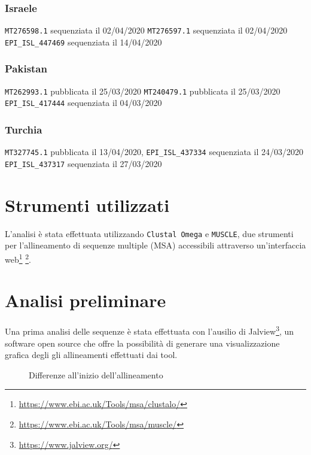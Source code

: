 \documentclass[11pt,italian]{article}
\makeatletter
\newcommand*{\lstitem}[1][]{%
  \setbox0\hbox\bgroup
    \patchcmd{\lst@InlineM}{\@empty}{\@empty\egroup\item[\usebox0]\leavevmode\ignorespaces}{}{}%
    \lstinline[#1]%
}
\makeatother
\begin{document}
\subsubsection*{Israele}
\begin{description}
    \lstitem{MT276598.1} sequenziata il 02/04/2020
    \lstitem{MT276597.1} sequenziata il 02/04/2020
    \lstitem{EPI_ISL_447469} sequenziata il 14/04/2020
\end{description}

\subsubsection*{Pakistan}
\begin{description}
    \lstitem{MT262993.1} pubblicata il 25/03/2020
    \lstitem{MT240479.1} pubblicata il 25/03/2020
    \lstitem{EPI_ISL_417444} sequenziata il 04/03/2020
\end{description}

\subsubsection*{Turchia}
\begin{description}
    \lstitem{MT327745.1} pubblicata il 13/04/2020,
    \lstitem{EPI_ISL_437334} sequenziata il 24/03/2020
    \lstitem{EPI_ISL_437317} sequenziata il 27/03/2020
\end{description}

\section{Strumenti utilizzati}
L'analisi è stata effettuata utilizzando \lstinline{Clustal Omega} e \lstinline{MUSCLE}, due strumenti per l'allineamento di sequenze multiple (MSA) accessibili attraverso un'interfaccia web\footnote{\url{https://www.ebi.ac.uk/Tools/msa/clustalo/}} \footnote{\url{https://www.ebi.ac.uk/Tools/msa/muscle/}}.

% \newpage
\section{Analisi preliminare}
Una prima analisi delle sequenze è stata effettuata con l'ausilio di Jalview\footnote{\url{https://www.jalview.org/}}, un software open source che offre la possibilità di generare una visualizzazione grafica degli gli allineamenti effettuati dai tool.

\begin{figure}[H]
  \caption{Differenze all'inizio dell'allineamento}
  \label{fig:jalview-start}
\end{figure}
\end{document}
